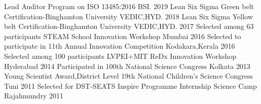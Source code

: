 \begin{cvhonors}
  \cvhonor
    {Lead Auditor Program on ISO 13485:2016}
    {}
    {BSI.}
    {2019}
  \cvhonor
    {Lean Six Sigma Green belt Certification-Binghamton University}
    {}
    {VEDIC,HYD.}
    {2018}
\cvhonor
    {Lean Six Sigma Yellow belt Certification-Binghamton University}
    {}
    {VEDIC,HYD.}
    {2017}
  \cvhonor
    {Selected among 63 participants STEAM School Innovation Workshop }
    {}
    {Mumbai}
    {2016}
 \cvhonor
    {Selected to participate in 11th Annual Innovation Competition }
    {}
    {Kodakara,Kerala}
    {2016}
  \cvhonor
    {Selected among 100 participants LVPEI+MIT ReDx Innovation Workshop}
    {}
    {Hyderabad}
    {2014}
  \cvhonor
    {Participated in 100th National Science Congress}
    {}
    { Kolkata}
    {2013}
 \cvhonor
    {Young Scientist Award,District Level 19th National Children's Science Congress}
    {}
    { Tuni}
    {2011}
 \cvhonor
    {Selected for DST-SEATS Inspire Programme Internship Science Camp}
    {}
    { Rajahmundry}
    {2011}
\end{cvhonors}

